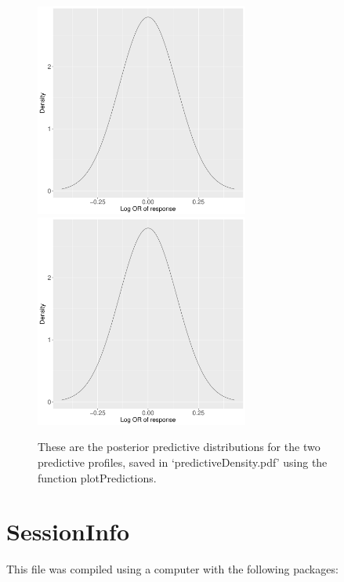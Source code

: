 \documentclass{article}
\begin{document}
\begin{figure}[ht]
\centering
\includegraphics[height=7cm,page=1]{"predictiveDensity"}
\includegraphics[height=7cm,page=1]{"predictiveDensity"}
\caption{These are the posterior predictive distributions for the two predictive profiles, saved in `predictiveDensity.pdf' using the function plotPredictions.\label{fig:predict}}
\end{figure}

\section{SessionInfo}

This file was compiled using a computer with the following packages: 
\end{document}
